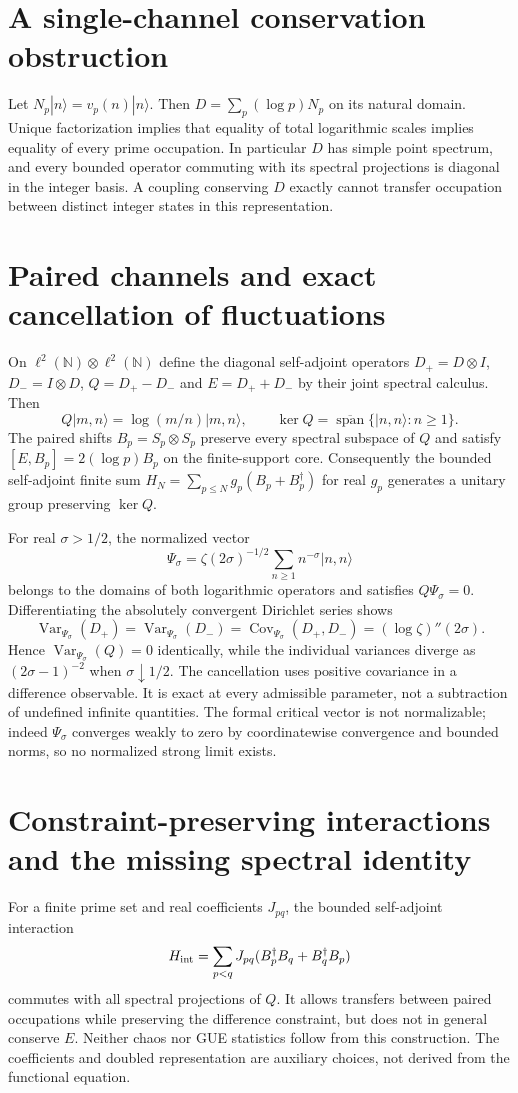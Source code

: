 \documentclass[11pt,a4paper]{article}
\theoremstyle{definition}\newtheorem{definition}[proposition]{Definition}
\theoremstyle{remark}\newtheorem{remark}[proposition]{Remark}
\begin{document}
\section{A single-channel conservation obstruction}
Let $N_p|n\rangle=v_p(n)|n\rangle$. Then $D=\sum_p(\log p)N_p$ on its natural domain. Unique factorization implies that equality of total logarithmic scales implies equality of every prime occupation. In particular $D$ has simple point spectrum, and every bounded operator commuting with its spectral projections is diagonal in the integer basis. A coupling conserving $D$ exactly cannot transfer occupation between distinct integer states in this representation.

\section{Paired channels and exact cancellation of fluctuations}
On $\ell^2(\mathbb N)\otimes\ell^2(\mathbb N)$ define the diagonal self-adjoint operators $D_+=D\otimes I$, $D_-=I\otimes D$, $Q=D_+-D_-$ and $E=D_++D_-$ by their joint spectral calculus. Then
\[
Q|m,n\rangle=\log(m/n)|m,n\rangle,\qquad
\ker Q=\overline{\operatorname{span}}\{|n,n\rangle:n\ge1\}.
\]
The paired shifts $B_p=S_p\otimes S_p$ preserve every spectral subspace of $Q$ and satisfy $[E,B_p]=2(\log p)B_p$ on the finite-support core. Consequently the bounded self-adjoint finite sum $H_N=\sum_{p\le N}g_p(B_p+B_p^\dagger)$ for real $g_p$ generates a unitary group preserving $\ker Q$.

For real $\sigma>1/2$, the normalized vector
\[
\Psi_\sigma=\zeta(2\sigma)^{-1/2}\sum_{n\ge1}n^{-\sigma}|n,n\rangle
\]
belongs to the domains of both logarithmic operators and satisfies $Q\Psi_\sigma=0$. Differentiating the absolutely convergent Dirichlet series shows
\[
\operatorname{Var}_{\Psi_\sigma}(D_+)
=\operatorname{Var}_{\Psi_\sigma}(D_-)
=\operatorname{Cov}_{\Psi_\sigma}(D_+,D_-)
=(\log\zeta)''(2\sigma).
\]
Hence $\operatorname{Var}_{\Psi_\sigma}(Q)=0$ identically, while the individual variances diverge as $(2\sigma-1)^{-2}$ when $\sigma\downarrow1/2$. The cancellation uses positive covariance in a difference observable. It is exact at every admissible parameter, not a subtraction of undefined infinite quantities. The formal critical vector is not normalizable; indeed $\Psi_\sigma$ converges weakly to zero by coordinatewise convergence and bounded norms, so no normalized strong limit exists.

\section{Constraint-preserving interactions and the missing spectral identity}
For a finite prime set and real coefficients $J_{pq}$, the bounded self-adjoint interaction
\[
H_{\rm int}=\sum_{p<q}J_{pq}(B_p^\dagger B_q+B_q^\dagger B_p)
\]
commutes with all spectral projections of $Q$. It allows transfers between paired occupations while preserving the difference constraint, but does not in general conserve $E$. Neither chaos nor GUE statistics follow from this construction. The coefficients and doubled representation are auxiliary choices, not derived from the functional equation.
\end{document}
